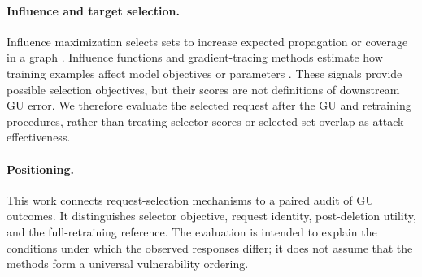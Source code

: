 \paragraph{Influence and target selection.}
Influence maximization selects sets to increase expected propagation or coverage in a graph \cite{kempe2003maximizing,leskovec2007cost,goyal2011celf++}. Influence functions and gradient-tracing methods estimate how training examples affect model objectives or parameters \cite{koh2017understanding,pruthi2020estimating}. These signals provide possible selection objectives, but their scores are not definitions of downstream GU error. We therefore evaluate the selected request after the GU and retraining procedures, rather than treating selector scores or selected-set overlap as attack effectiveness.

\paragraph{Positioning.}
This work connects request-selection mechanisms to a paired audit of GU outcomes. It distinguishes selector objective, request identity, post-deletion utility, and the full-retraining reference. The evaluation is intended to explain the conditions under which the observed responses differ; it does not assume that the methods form a universal vulnerability ordering.
